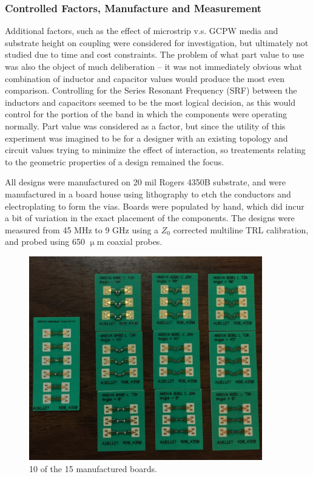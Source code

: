 \documentclass[12pt]{usfcoe}
\begin{document}
    \subsubsection{Controlled Factors, Manufacture and Measurement} 
    Additional factors, such as the effect of microstrip v.s. GCPW media and substrate height on coupling  were considered for investigation, but ultimately not studied due to time and cost constraints.
    The problem of what part value to use was also the object of much deliberation -- it was not immediately obvious what combination of inductor and capacitor values would produce the most even comparison.
    Controlling for the Series Resonant Frequency (SRF) between the inductors and capacitors seemed to be the most logical decision, as this would control for the portion of the band in which the components were operating normally.
    Part value was considered as a factor, but since the utility of this experiment was imagined to be for a designer with an existing topology and circuit values trying to minimize the effect of interaction, so treatements relating to the geometric properties of a design remained the focus.
    
    All designs were manufactured on 20 mil Rogers 4350B substrate, and were manufactured in a board house using lithography to etch the conductors and electroplating to form the vias.
    Boards were populated by hand, which did incur a bit of variation in the exact placement of the components.
    The designs were measured from  45 MHz to 9 GHz using a $Z_0$ corrected multiline TRL calibration, and probed using 650 $\upmu$m coaxial probes. %
    
    \begin{figure}[H]
		\begin{center}
        	\includegraphics[width=4in]{images/ANOVA/manufactured_test_fixtures.jpg} 
			\caption{10 of the 15 manufactured boards.} 
			\label{fig:test_fixtures_irl}
		\end{center}
	\end{figure}    
    
\end{document}
